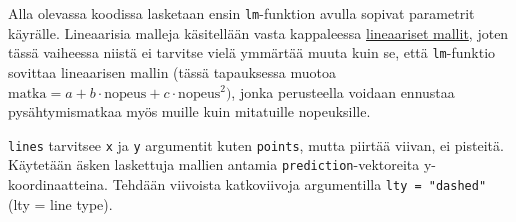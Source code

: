 \documentclass[
]{book}
\newenvironment{Shaded}{\begin{snugshade}}{\end{snugshade}}
\newcommand{\CommentTok}[1]{\textcolor[rgb]{0.56,0.35,0.01}{\textit{#1}}}
\newcommand{\DecValTok}[1]{\textcolor[rgb]{0.00,0.00,0.81}{#1}}
\newcommand{\FunctionTok}[1]{\textcolor[rgb]{0.00,0.00,0.00}{#1}}
\newcommand{\NormalTok}[1]{#1}
\newcommand{\OtherTok}[1]{\textcolor[rgb]{0.56,0.35,0.01}{#1}}
\newcommand{\SpecialCharTok}[1]{\textcolor[rgb]{0.00,0.00,0.00}{#1}}
\begin{document}
Alla olevassa koodissa lasketaan ensin \texttt{lm}-funktion avulla sopivat parametrit käyrälle. Lineaarisia malleja käsitellään vasta kappaleessa \protect\hyperlink{linear_models}{lineaariset mallit}, joten tässä vaiheessa niistä ei tarvitse vielä ymmärtää muuta kuin se, että \texttt{lm}-funktio sovittaa lineaarisen mallin (tässä tapauksessa muotoa \(\text{matka} = a + b \cdot \text{nopeus} + c \cdot \text{nopeus}^2)\), jonka perusteella voidaan ennustaa pysähtymismatkaa myös muille kuin mitatuille nopeuksille.

\begin{Shaded}
\end{Shaded}

\texttt{lines} tarvitsee \texttt{x} ja \texttt{y} argumentit kuten \texttt{points}, mutta piirtää viivan, ei pisteitä. Käytetään äsken laskettuja mallien antamia \texttt{prediction}-vektoreita y-koordinaatteina. Tehdään viivoista katkoviivoja argumentilla \texttt{lty\ =\ "dashed"} (lty = line type).
\end{document}
